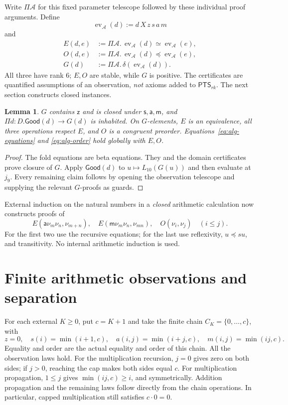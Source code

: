 \documentclass[11pt,a4paper]{article}
\newcommand{\PTS}{\mathsf{PTS}_{rk}}
\newcommand{\Good}{\mathsf{Good}}
\newcommand{\zz}{\mathsf z}
\newcommand{\ssu}{\mathsf s}
\newcommand{\addD}{\mathsf a}
\newcommand{\mm}{\mathsf m}
\newcommand{\num}[1]{\nu_{#1}}
\newcommand{\ev}{\operatorname{ev}}
\newcommand{\allA}{\Pi\mathcal A.\,}
\newtheorem{lemma}[theorem]{Lemma}
\theoremstyle{remark}\newtheorem*{remark}{Remark}
\begin{document}
Write $\Pi\mathcal A$ for this fixed parameter telescope followed by these
individual proof arguments. Define
\[
 \ev_{\mathcal A}(d):=d\,X\,z\,s\,a\,m
\]
and
\begin{align*}
 E(d,e)&:=\allA\ev_{\mathcal A}(d)\simeq\ev_{\mathcal A}(e),\\
 O(d,e)&:=\allA\ev_{\mathcal A}(d)\preceq\ev_{\mathcal A}(e),\\
 G(d)&:=\allA\delta(\ev_{\mathcal A}(d)).
\end{align*}
All three have rank $6$; $E,O$ are stable, while $G$ is positive.
The certificates are quantified assumptions of an observation, \emph{not}
axioms added to $\PTS$. The next section constructs closed instances.

\begin{lemma}\label{lem:basic}
$G$ contains $\zz$ and is closed under $\ssu,\addD,\mm$, and
$\Pi d:D.\Good(d)\to G(d)$ is inhabited. On $G$-elements, $E$ is an
equivalence, all three operations respect $E$, and $O$ is a congruent
preorder. Equations~\eqref{eq:alg-equations} and
\eqref{eq:alg-order} hold globally with $E,O$.
\end{lemma}
\begin{proof}
The fold equations are beta equations. They and the domain certificates
prove closure of $G$. Apply $\Good(d)$ to $u\mapsto L_{10}(G(u))$ and
then evaluate at $j_9$. Every remaining claim follows by opening the
observation telescope and supplying the relevant $G$-proofs as guards.
\end{proof}
External induction on the natural numbers in a \emph{closed} arithmetic
calculation now constructs proofs of
\[
 E(\addD\num m\num n,\num{m+n}),\quad
 E(\mm\num m\num n,\num{mn}),\quad
 O(\num i,\num j)\quad(i\leq j).
\tag{*}\label{eq:ground}
\]
For the first two use the recursive equations; for the last use reflexivity,
$u\preceq su$, and transitivity. No internal arithmetic induction is used.

\section{Finite arithmetic observations and separation}
For each external $K\geq0$, put $c=K+1$ and take the finite chain
$C_K=\{0,\ldots,c\}$, with
\[
 z=0,\quad s(i)=\min(i+1,c),\quad
 a(i,j)=\min(i+j,c),\quad m(i,j)=\min(ij,c).
\]
Equality and order are the actual equality and order of this chain. All the
observation laws hold. For the multiplication recursion, $j=0$ gives zero
on both sides; if $j>0$, reaching the cap makes both sides equal $c$.
For multiplication propagation, $1\leq j$ gives
$\min(ij,c)\geq i$, and symmetrically. Addition propagation and the remaining
laws follow directly from the chain operations. In particular, capped
multiplication still satisfies $c\cdot0=0$.
\end{document}
